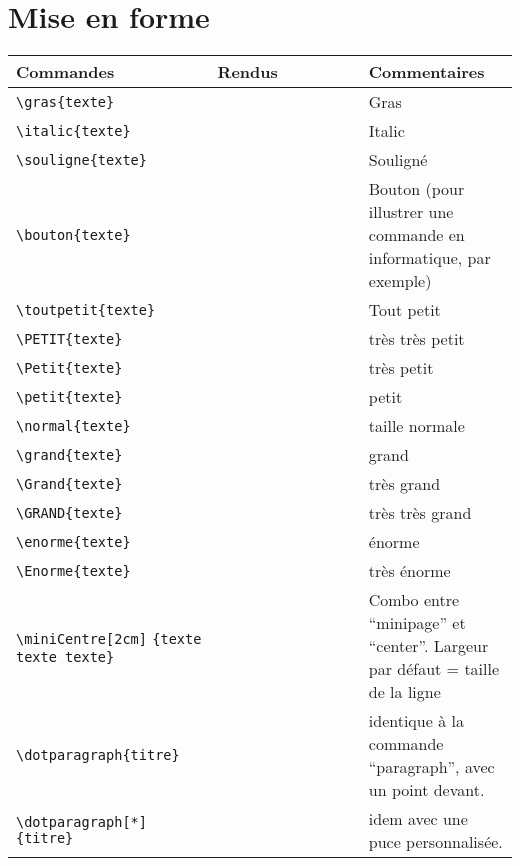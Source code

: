\documentclass[a4paper,12pt]{article}
\begin{document}
	\section{Mise en forme}
		\noindent
		\begin{tabular}{|p{0.4\linewidth}|p{0.3\linewidth}|p{0.3\linewidth}|}
			\hline
				\textbf{Commandes}&\textbf{Rendus}&\textbf{Commentaires}
			\\\hline\hline
				\verb!\gras{texte}!	&	\gras{texte}	&	Gras
			\\\hline
				\verb!\italic{texte}!	&	\italic{texte}	&	Italic
			\\\hline
				\verb!\souligne{texte}!	&	\souligne{texte}&	Souligné
			\\\hline
				\verb!\bouton{texte}!	&	\bouton{texte}	&	Bouton (pour illustrer une commande en informatique, par exemple)
			\\\hline
				\verb!\toutpetit{texte}!&	\toutpetit{texte}	&	Tout petit
			\\\hline
				\verb!\PETIT{texte}!	&	\PETIT{texte}	&	très très petit
			\\\hline
				\verb!\Petit{texte}!	&	\Petit{texte}	&	très petit
			\\\hline
				\verb!\petit{texte}!	&	\petit{texte}	&	petit
			\\\hline
				\verb!\normal{texte}!	&	\normal{texte}	&	taille normale
			\\\hline
				\verb!\grand{texte}!	&	\grand{texte}	&	grand
			\\\hline
				\verb!\Grand{texte}!	&	\Grand{texte}	&	très grand
			\\\hline
				\verb!\GRAND{texte}!	&	\GRAND{texte}	&	très très grand
			\\\hline
				\verb!\enorme{texte}!	&	\enorme{texte}	&	énorme
			\\\hline
				\verb!\Enorme{texte}!	&	\Enorme{texte}	&	très énorme
			\\\hline
				\verb!\miniCentre[2cm]! 
					\verb!{texte texte texte}!	&	\miniCentre[2cm]{texte texte texte}	&	Combo entre ``minipage'' et ``center''. Largeur par défaut = taille de la ligne
			\\\hline
				\verb!\dotparagraph{titre}! 	&	\dotparagraph{titre}	&	identique à la commande ``paragraph'', avec un point devant.
			\\\hline
				\verb!\dotparagraph[*]{titre}! 	&	\dotparagraph[*]{titre}	&	idem avec une puce personnalisée.
			\\\hline
		\end{tabular}
\end{document}
